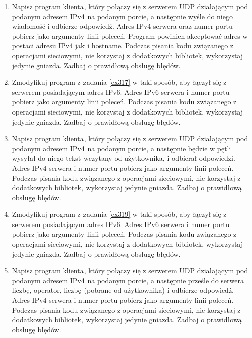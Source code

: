 \documentclass{article}
\begin{document}
\begin{enumerate}[label=\textbf{3.\arabic*}, resume]\setlength{\itemsep}{1em}

\item \label{ex317}  Napisz program klienta, który połączy się z serwerem UDP działającym pod podanym adresem IPv4 na podanym porcie, a następnie wyśle do niego wiadomość i odbierze odpowiedź. Adres IPv4 serwera oraz numer portu pobierz jako argumenty linii poleceń. Program powinien akceptować adres w postaci adresu IPv4 jak i hostname.  Podczas pisania kodu związanego z operacjami sieciowymi, nie korzystaj z dodatkowych bibliotek, wykorzystaj jedynie gniazda. Zadbaj o prawidłową obsługę błędów.  

\item  Zmodyfikuj program z zadania \ref{ex317} w taki sposób,  aby łączył się z serwerem posiadającym adres IPv6.  Adres IPv6 serwera i numer portu pobierz jako argumenty linii poleceń. Podczas pisania kodu związanego z operacjami sieciowymi, nie korzystaj z dodatkowych bibliotek, wykorzystaj jedynie gniazda. Zadbaj o prawidłową obsługę błędów. 

\item \label{ex319} Napisz program klienta, który połączy się z serwerem UDP działającym pod podanym adresem IPv4 na podanym porcie,  a następnie będzie w pętli wysyłał do niego tekst wczytany od użytkownika, i odbierał odpowiedzi.    Adres IPv4 serwera i numer portu pobierz jako argumenty linii poleceń. Podczas pisania kodu związanego z operacjami sieciowymi, nie korzystaj z dodatkowych bibliotek, wykorzystaj jedynie gniazda. Zadbaj o prawidłową obsługę błędów. 

\item  Zmodyfikuj program z zadania \ref{ex319} w taki sposób,  aby łączył się z serwerem posiadającym adres IPv6. Adres IPv6 serwera i numer portu pobierz jako argumenty linii poleceń. Podczas pisania kodu związanego z operacjami sieciowymi, nie korzystaj z dodatkowych bibliotek, wykorzystaj jedynie gniazda. Zadbaj o prawidłową obsługę błędów. 

\item \label{ex321} Napisz program klienta, który połączy się z serwerem UDP działającym pod podanym adresem IPv4 na podanym porcie, a następnie prześle do serwera liczbę, operator, liczbę (pobrane od użytkownika) i odbierze odpowiedź. Adres IPv4 serwera i numer portu pobierz jako argumenty linii poleceń.  Podczas pisania kodu związanego z operacjami sieciowymi, nie korzystaj z dodatkowych bibliotek, wykorzystaj jedynie gniazda. Zadbaj o prawidłową obsługę błędów. 


\end{enumerate}
\end{document}
